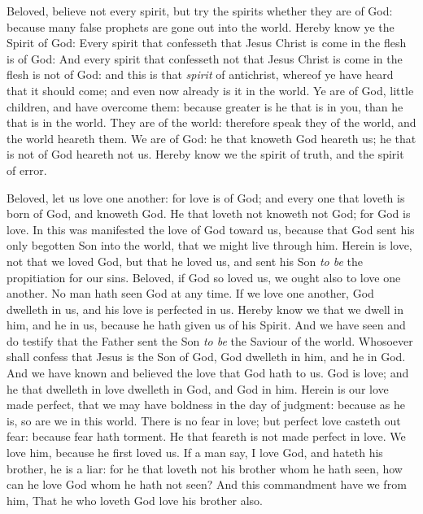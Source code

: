 \documentclass[11pt,letterpaper,oneside]{memoir}
\begin{document}
Beloved, believe not every spirit, but try the spirits whether they
are of God: because many false prophets are gone out into the world.
Hereby know ye the Spirit of God: Every spirit that confesseth that
Jesus Christ is come in the flesh is of God:  And every spirit that
confesseth not that Jesus Christ is come in the flesh is not of God:
and this is that \emph{spirit} of antichrist, whereof ye have heard
that it should come; and even now already is it in the world.  Ye are
of God, little children, and have overcome them: because greater is he
that is in you, than he that is in the world.  They are of the world:
therefore speak they of the world, and the world heareth them.  We are
of God: he that knoweth God heareth us; he that is not of God heareth
not us. Hereby know we the spirit of truth, and the spirit of error.

Beloved, let us love one another: for love is of God; and every one
that loveth is born of God, and knoweth God.  He that loveth not
knoweth not God; for God is love.  In this was manifested the love of
God toward us, because that God sent his only begotten Son into the
world, that we might live through him.  Herein is love, not that we
loved God, but that he loved us, and sent his Son \emph{to be} the
propitiation for our sins.  Beloved, if God so loved us, we ought also
to love one another.  No man hath seen God at any time. If we love one
another, God dwelleth in us, and his love is perfected in us.  Hereby
know we that we dwell in him, and he in us, because he hath given us
of his Spirit.  And we have seen and do testify that the Father sent
the Son \emph{to be} the Saviour of the world.  Whosoever shall
confess that Jesus is the Son of God, God dwelleth in him, and he in
God.  And we have known and believed the love that God hath to us. God
is love; and he that dwelleth in love dwelleth in God, and God in him.
Herein is our love made perfect, that we may have boldness in the day
of judgment: because as he is, so are we in this world.  There is no
fear in love; but perfect love casteth out fear: because fear hath
torment. He that feareth is not made perfect in love.  We love him,
because he first loved us.  If a man say, I love God, and hateth his
brother, he is a liar: for he that loveth not his brother whom he hath
seen, how can he love God whom he hath not seen?  And this commandment
have we from him, That he who loveth God love his brother also.
\end{document}
